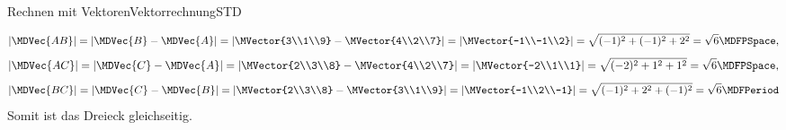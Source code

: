 \begin{MXContent}{Rechnen mit Vektoren}{Vektorrechnung}{STD}
\begin{MHint}{\iSolution}
\[
 |\MDVec{A B}| = |\MDVec{B}-\MDVec{A}|=\left|\MVector{3\\1\\9}-\MVector{4\\2\\7}\right|=\left|\MVector{-1\\-1\\2}\right|=\sqrt{(-1)^2+(-1)^2+2^2}=\sqrt{6} \MDFPSpace,
\]
\[
 |\MDVec{A C}| = |\MDVec{C}-\MDVec{A}|=\left|\MVector{2\\3\\8}-\MVector{4\\2\\7}\right|=\left|\MVector{-2\\1\\1}\right|=\sqrt{(-2)^2+1^2+1^2}=\sqrt{6} \MDFPSpace,
\]
\[
 |\MDVec{B C}| = |\MDVec{C}-\MDVec{B}|=\left|\MVector{2\\3\\8}-\MVector{3\\1\\9}\right|=\left|\MVector{-1\\2\\-1}\right|=\sqrt{(-1)^2+2^2+(-1)^2}=\sqrt{6} \MDFPeriod
\]
Somit ist das Dreieck gleichseitig.
\end{MHint}


\end{MXContent}


